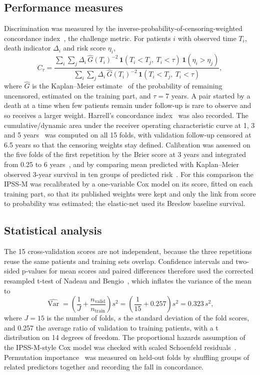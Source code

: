 \documentclass[10pt,letterpaper]{article}
\begin{document}
\subsection*{Performance measures}
Discrimination was measured by the inverse-probability-of-censoring-weighted concordance
index~\cite{uno2011}, the challenge metric. For patients $i$ with observed time $T_i$,
death indicator $\Delta_i$ and risk score $\eta_i$,
\begin{equation}
C_{\tau} = \frac{\sum_{i}\sum_{j} \Delta_i\,\hat{G}(T_i)^{-2}\,
\mathbf{1}(T_i < T_j,\ T_i < \tau)\,\mathbf{1}(\eta_i > \eta_j)}
{\sum_{i}\sum_{j} \Delta_i\,\hat{G}(T_i)^{-2}\,\mathbf{1}(T_i < T_j,\ T_i < \tau)},
\label{eq:uno}
\end{equation}
where $\hat{G}$ is the Kaplan--Meier estimate~\cite{kaplan1958} of the probability of
remaining uncensored, estimated on the training part, and $\tau = 7$ years. A pair started
by a death at a time when few patients remain under follow-up is rare to observe and so
receives a larger weight. Harrell's concordance index~\cite{harrell1982} was also recorded.
The cumulative/dynamic area under the receiver operating characteristic curve at 1, 3 and 5
years~\cite{hung2010} was computed on all 15 folds, with validation follow-up censored at
6.5 years so that the censoring weights stay defined. Calibration was assessed on the five
folds of the first repetition by the Brier score at 3 years and integrated from 0.25 to 6
years~\cite{graf1999}, and by comparing mean predicted with Kaplan--Meier observed 3-year
survival in ten groups of predicted risk~\cite{vancalster2019}. For this comparison the
IPSS-M was recalibrated by a one-variable Cox model on its score, fitted on each training
part, so that its published weights were kept and only the link from score to probability
was estimated; the elastic-net used its Breslow baseline survival.

\subsection*{Statistical analysis}
The 15 cross-validation scores are not independent, because the three repetitions reuse the
same patients and training sets overlap. Confidence intervals and two-sided p-values for
mean scores and paired differences therefore used the corrected resampled t-test of Nadeau
and Bengio~\cite{nadeau2003}, which inflates the variance of the mean to
\begin{equation}
\widehat{\operatorname{Var}} = \left(\frac{1}{J} + \frac{n_{\text{valid}}}{n_{\text{train}}}\right) s^{2}
= \left(\frac{1}{15} + 0.257\right) s^{2} = 0.323\, s^{2},
\label{eq:nb}
\end{equation}
where $J = 15$ is the number of folds, $s$ the standard deviation of the fold scores, and
0.257 the average ratio of validation to training patients, with a t distribution on 14
degrees of freedom. The proportional hazards assumption of the IPSS-M-style Cox model was
checked with scaled Schoenfeld residuals~\cite{grambsch1994}. Permutation
importance~\cite{breiman2001} was measured on held-out folds by shuffling groups of related
predictors together and recording the fall in concordance.
\end{document}
